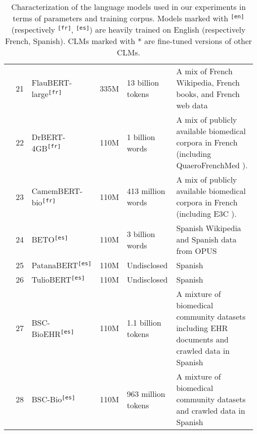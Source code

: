 \begin{table*}[htbp]
{{\begin{tabular}{clp{7cm}rp{3cm}p{10cm}}
\cmidrule{2-6}
 & 21 & FlauBERT-large\textsuperscript{\texttt{[fr]}} \cite{le2019flaubert} & 335M & 13 billion tokens & A mix of French Wikipedia, French books, and French web data \\
\cmidrule{2-6}
 & 22 & DrBERT-4GB\textsuperscript{\texttt{[fr]}} \cite{labrak2023drbert} & 110M & 1 billion words & A mix of publicly available biomedical corpora in French (including QuaeroFrenchMed \cite{neveol2014quaero}). \\
\cmidrule{2-6}
 & 23 & CamemBERT-bio\textsuperscript{\texttt{[fr]}} \cite{touchent2023camembertbio} & 110M & 413 million words & A mix of publicly available biomedical corpora in French (including E3C \cite{magnini2021e3c}). \\
\cmidrule{2-6}
 & 24 & BETO\textsuperscript{\texttt{[es]}} \cite{canete2020beto} & 110M & 3 billion words & Spanish Wikipedia and Spanish data from OPUS \cite{tiedemann2012parallel} \\
\cmidrule{2-6}
 & 25 & PatanaBERT\textsuperscript{\texttt{[es]}} & 110M & Undisclosed & Spanish \\
\cmidrule{2-6}
 & 26 & TulioBERT\textsuperscript{\texttt{[es]}} & 110M & Undisclosed & Spanish \\
\cmidrule{2-6}
 & 27 & BSC-BioEHR\textsuperscript{\texttt{[es]}} \cite{carrino2022pretrained} & 110M & 1.1 billion tokens & A mixture of biomedical community datasets including EHR documents and crawled data in Spanish \\
\cmidrule{2-6}
 & 28 & BSC-Bio\textsuperscript{\texttt{[es]}} \cite{carrino2022pretrained} & 110M & 963 million tokens & A mixture of biomedical community datasets and crawled data in Spanish \\
\bottomrule
\end{tabular}}}
\caption{Characterization of the language models used in our experiments in terms of parameters and training corpus. Models marked with \textsuperscript{\texttt{[en]}} (respectively \textsuperscript{\texttt{[fr]}}, \textsuperscript{\texttt{[es]}}) are heavily trained on English (respectively French, Spanish). CLMs marked with * are fine-tuned versions of other CLMs.}
\label{tab:LM_features}
\end{table*}
